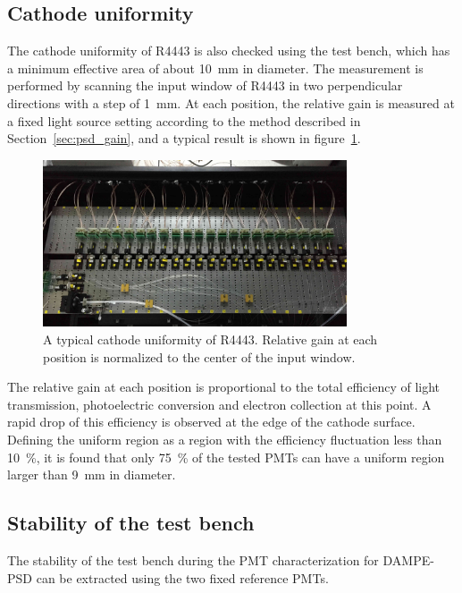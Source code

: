 \documentclass{JINST}
\begin{document}
\subsection{Cathode uniformity}
\label{sec:psd_cathodescan}
	
The cathode uniformity of R4443 is also checked using the test bench, which has a minimum effective area of about \SI{10}{\milli\meter} in diameter.
The measurement is performed by scanning the input window of R4443 in two perpendicular directions with a step of \SI{1}{\milli\meter}.
At each position, the relative gain is measured at a fixed light source setting according to the method described in Section~\ref{sec:psd_gain}, and a typical result is shown in figure~\ref{fig:FIG7}.
	
\begin{figure}[tbp]
	\centering
	\includegraphics[width=90mm]{FIG7}
	\caption{A typical cathode uniformity of R4443.
			Relative gain at each position is normalized to the center of the input window.}
	\label{fig:FIG7}
\end{figure} 
	
The relative gain at each position is proportional to the total efficiency of light transmission, photoelectric conversion and electron collection at this point.
A rapid drop of this efficiency is observed at the edge of the cathode surface. 
Defining the uniform region as a region with the efficiency fluctuation less than \SI{10}{\percent}, it is found that only \SI{75}{\percent} of the tested PMTs can have a uniform region larger than \SI{9}{\milli\meter} in diameter. 
	
	
\subsection{Stability of the test bench}
\label{sec:stability}
	
The stability of the test bench during the PMT characterization for DAMPE-PSD can be extracted using the two fixed reference PMTs.
\end{document}
